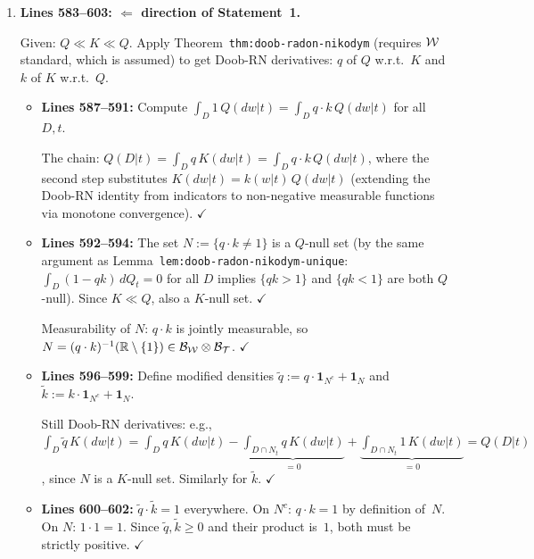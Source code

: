 \documentclass{article}
\begin{document}
\begin{enumerate}[leftmargin=*]
  \item \textbf{Lines 583--603: $\Leftarrow$ direction of Statement~1.}

    Given: $Q \ll K \ll Q$.  Apply Theorem~\texttt{thm:doob-radon-nikodym}
    (requires $\mathcal{W}$ standard, which is assumed) to get Doob-RN derivatives:
    $q$ of $Q$ w.r.t.\ $K$ and $k$ of $K$ w.r.t.\ $Q$.

    \begin{itemize}
      \item \textbf{Lines 587--591:} Compute
        $\int_D 1\,Q(dw|t) = \int_D q\cdot k\,Q(dw|t)$ for all $D,t$.

        The chain: $Q(D|t) = \int_D q\,K(dw|t) = \int_D q\cdot k\,Q(dw|t)$,
        where the second step substitutes $K(dw|t) = k(w|t)\,Q(dw|t)$
        (extending the Doob-RN identity from indicators to non-negative
        measurable functions via monotone convergence).  $\checkmark$

      \item \textbf{Lines 592--594:} The set $N := \{q\cdot k \neq 1\}$ is a
        $Q$-null set (by the same argument as
        Lemma~\texttt{lem:doob-radon-nikodym-unique}: $\int_D(1-qk)\,dQ_t=0$
        for all $D$ implies $\{qk>1\}$ and $\{qk<1\}$ are both $Q$-null).
        Since $K \ll Q$, also a $K$-null set.  $\checkmark$

        Measurability of $N$: $q\cdot k$ is jointly measurable, so
        $N = (q\cdot k)^{-1}(\mathbb{R}\setminus\{1\}) \in \mathcal{B}_{\mathcal{W}}\otimes\mathcal{B}_{\mathcal{T}}$.
        $\checkmark$

      \item \textbf{Lines 596--599:} Define modified densities
        $\tilde{q} := q\cdot\mathbf{1}_{N^c} + \mathbf{1}_N$ and
        $\tilde{k} := k\cdot\mathbf{1}_{N^c} + \mathbf{1}_N$.

        Still Doob-RN derivatives: e.g.,
        $\int_D\tilde{q}\,K(dw|t)
          = \int_D q\,K(dw|t) - \underbrace{\int_{D\cap N_t} q\,K(dw|t)}_{=0}
            + \underbrace{\int_{D\cap N_t} 1\,K(dw|t)}_{=0} = Q(D|t)$,
        since $N$ is a $K$-null set. Similarly for $\tilde{k}$.  $\checkmark$

      \item \textbf{Lines 600--602:} $\tilde{q}\cdot\tilde{k} = 1$ everywhere.
        On $N^c$: $q\cdot k = 1$ by definition of~$N$.
        On $N$: $1\cdot 1 = 1$.
        Since $\tilde{q},\tilde{k}\ge 0$ and their product is~$1$,
        both must be strictly positive.  $\checkmark$
    \end{itemize}
\end{enumerate}
\end{document}
